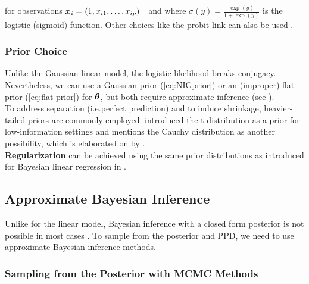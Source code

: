 for observations $\bm{x}_i = (1, x_{i1}, \dots, x_{ip})^\top$ and where $\sigma(y) = \frac{\exp(y)}{1 + \exp(y)}$ is the logistic (sigmoid) function.  Other choices like the probit link can also be used \citep[see e.g.][]{albert_bayesian_1993}.

\subsubsection*{Prior Choice}

Unlike the Gaussian linear model, the logistic likelihood breaks conjugacy.
Nevertheless, we can use a Gaussian prior (\autoref{eq:NIGprior}) or an (improper) flat prior (\autoref{eq:flat-prior}) for $\bm{\theta}$, but both require approximate inference (see ).\\

To address separation (i.e.\@ perfect prediction) and to induce shrinkage, heavier-tailed priors are commonly employed.
\citet{gelman_weakly_2008} introduced the t-distribution as a prior for low-information settings and mentions the Cauchy distribution as another possibility, which is elaborated on by \citet{ghosh_use_2017}.\\

\textbf{Regularization} can be achieved using the same prior distributions as introduced for Bayesian linear regression in  \citep[see e.g.][]{van_erp_shrinkage_2019,fahrmeir_bayesian_2010,ohara_review_2009}.

\subsection{Approximate Bayesian Inference} \label{sec:logit-inf}

Unlike for the linear model, Bayesian inference with a closed form posterior is not possible in most cases \citep[see e.g.][]{polson_bayesian_2013}.
To sample from the posterior and PPD, we need to use approximate Bayesian inference methods.

\subsubsection*{Sampling from the Posterior with MCMC Methods}

